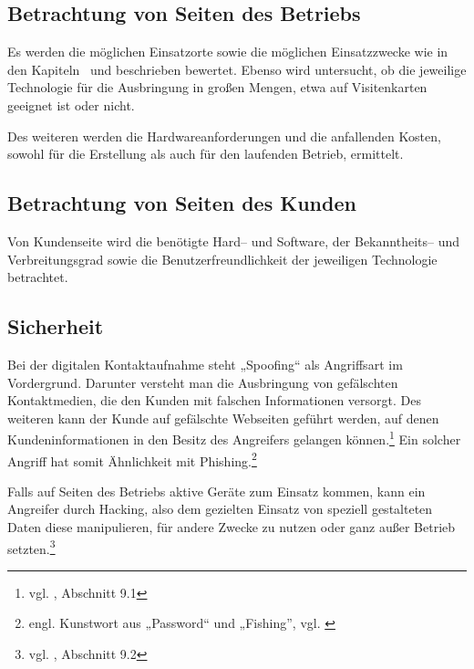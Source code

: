 \subsection{Betrachtung von Seiten des Betriebs} %
\label{sub:anforderungen_auf_seiten_des_betriebs}
Es werden die möglichen Einsatzorte sowie die möglichen Einsatzzwecke wie in den Kapiteln~ und  beschrieben bewertet. Ebenso wird untersucht, ob die jeweilige Technologie für die Ausbringung in großen Mengen, etwa auf Visitenkarten geeignet ist oder nicht.

Des weiteren werden die Hardwareanforderungen und die anfallenden Kosten, sowohl für die Erstellung als auch für den laufenden Betrieb, ermittelt. 

\subsection{Betrachtung von Seiten des Kunden} %
\label{sub:anforderungen_auf_seiten_des_kunden}
Von Kundenseite wird die benötigte Hard– und Software, der Bekanntheits– und Verbreitungsgrad sowie die Benutzerfreundlichkeit der jeweiligen Technologie betrachtet. 

\subsection{Sicherheit} %
\label{sub:sicherheit}
Bei der digitalen Kontaktaufnahme steht „Spoofing“ als Angriffsart im Vordergrund. Darunter versteht man die Ausbringung von gefälschten Kontaktmedien, die den Kunden mit falschen Informationen versorgt. Des weiteren kann der Kunde auf gefälschte Webseiten geführt werden, auf denen Kundeninformationen in den Besitz des Angreifers gelangen können.\footnote{vgl. \cite{gilchrist}, Abschnitt 9.1} Ein solcher Angriff hat somit Ähnlichkeit mit Phishing.\footnote{engl. Kunstwort aus „Password“ und „Fishing”, vgl. \cite{bsi:phishing}}

Falls auf Seiten des Betriebs aktive Geräte zum Einsatz kommen, kann ein Angreifer durch Hacking, also dem gezielten Einsatz von speziell gestalteten Daten diese manipulieren, für andere Zwecke zu nutzen oder ganz außer Betrieb setzten.\footnote{vgl. \cite{gilchrist}, Abschnitt 9.2} 

